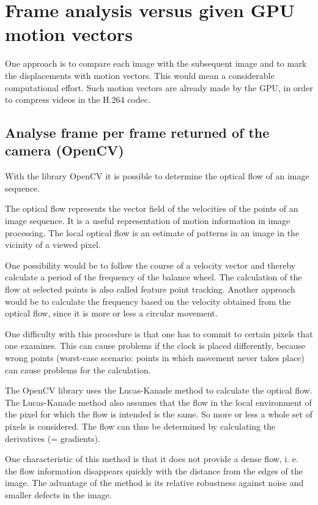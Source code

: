 \documentclass[12pt, a4paper]{report}
\begin{document}
\section{Frame analysis versus given GPU motion vectors}
One approach is to compare each image with the subsequent image and to mark the displacements with motion vectors. This would mean a considerable computational effort.
Such motion vectors are already made by the GPU, in order to compress videos in the H.264 codec.

\subsection{Analyse frame per frame returned of the camera (OpenCV)}
With the library OpenCV it is possible to determine the optical flow of an image sequence. 

The optical flow represents the vector field of the velocities of the points of an image sequence. It is a useful representation of motion information in image processing. The local optical flow is an estimate of patterns in an image in the vicinity of a viewed pixel. 

One possibility would be to follow the course of a velocity vector and thereby calculate a period of the frequency of the balance wheel. The calculation of the flow at selected points is also called feature point tracking. Another approach would be to calculate the frequency based on the velocity obtained from the optical flow, since it is more or less a circular movement. 

One difficulty with this procedure is that one has to commit to certain pixels that one examines. This can cause problems if the clock is placed differently, because wrong points (worst-case scenario: points in which movement never takes place) can cause problems for the calculation.  

The OpenCV library uses the Lucas-Kanade method to calculate the optical flow. The Lucas-Kanade method also assumes that the flow in the local environment of the pixel for which the flow is intended is the same. So more or less a whole set of pixels is considered. The flow can thus be determined by calculating the derivatives (= gradients). 

One characteristic of this method is that it does not provide a dense flow, i. e. the flow information disappears quickly with the distance from the edges of the image. The advantage of the method is its relative robustness against noise and smaller defects in the image.
\end{document}

